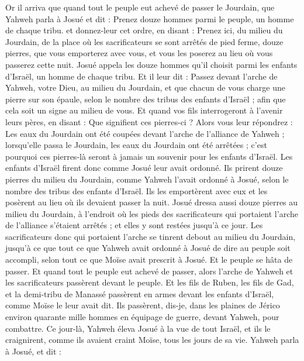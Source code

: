 \begin{multicols}{2}
\VerseOne{}Or il arriva que quand tout le peuple eut achevé de passer le Jourdain, que Yahweh parla à Josué et dit :
Prenez douze hommes parmi le peuple, un homme de chaque tribu.
et donnez-leur cet ordre, en disant : Prenez ici, du milieu du Jourdain, de la place où les sacrificateurs se sont arrêtés de pied ferme, douze pierres, que vous emporterez avec vous, et vous les poserez au lieu où vous passerez cette nuit.
Josué appela les douze hommes qu'il choisit parmi les enfants d'Israël, un homme de chaque tribu.
Et il leur dit : Passez devant l'arche de Yahweh, votre Dieu, au milieu du Jourdain, et que chacun de vous charge une pierre sur son épaule, selon le nombre des tribus des enfants d'Israël ;
afin que cela soit un signe au milieu de vous. Et quand vos fils interrogeront à l'avenir leurs pères, en disant : Que signifient ces pierres-ci ?
Alors vous leur répondrez : Les eaux du Jourdain ont été coupées devant l'arche de l'alliance de Yahweh ; lorsqu'elle passa le Jourdain, les eaux du Jourdain ont été arrêtées ; c'est pourquoi ces pierres-là seront à jamais un souvenir pour les enfants d'Israël.
Les enfants d'Israël firent donc comme Josué leur avait ordonné. Ils prirent douze pierres du milieu du Jourdain, comme Yahweh l'avait ordonné à Josué, selon le nombre des tribus des enfants d'Israël. Ils les emportèrent avec eux et les posèrent au lieu où ils devaient passer la nuit.
Josué dressa aussi douze pierres au milieu du Jourdain, à l'endroit où les pieds des sacrificateurs qui portaient l'arche de l'alliance s'étaient arrêtés ; et elles y sont restées jusqu'à ce jour.
Les sacrificateurs donc qui portaient l'arche se tinrent debout au milieu du Jourdain, jusqu'à ce que tout ce que Yahweh avait ordonné à Josué de dire au peuple soit accompli, selon tout ce que Moïse avait prescrit à Josué. Et le peuple se hâta de passer.
Et quand tout le peuple eut achevé de passer, alors l'arche de Yahweh et les sacrificateurs passèrent devant le peuple.
Et les fils de Ruben, les fils de Gad, et la demi-tribu de Manassé passèrent en armes devant les enfants d'Israël, comme Moïse le leur avait dit.
Ils passèrent, dis-je, dans les plaines de Jérico environ quarante mille hommes en équipage de guerre, devant Yahweh, pour combattre. 
Ce jour-là, Yahweh éleva Josué à la vue de tout Israël, et ils le craignirent, comme ils avaient craint Moïse, tous les jours de sa vie.
Yahweh parla à Josué, et dit :

\end{multicols}
